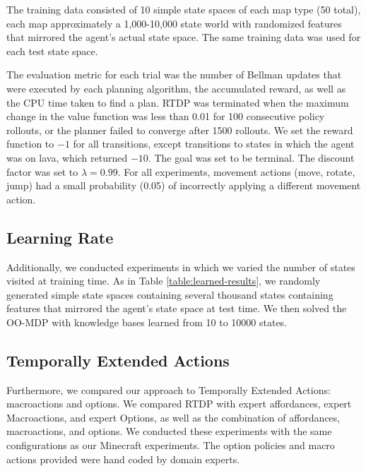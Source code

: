 \documentclass[conference]{IEEEtran}
\newcommand{\dnote}[1]{\textcolor{Green}{\textbf{}}}
\begin{document}
The training data consisted of 10 simple state spaces of each map type
(50 total), each map approximately a 1,000-10,000 state world with randomized
features that mirrored the agent's actual state space. The same training data
was used for each test state space.

The evaluation metric for each trial was the
number of Bellman updates that were executed by each planning
algorithm, the accumulated reward, as well as the CPU time taken to find a plan. RTDP was terminated
when the maximum change in the value function was less than 0.01 for 100 
consecutive policy rollouts, or the planner failed to converge after 1500 rollouts. 
We set the reward  function to $-1$ for all transitions, except transitions to states in 
which the agent was on lava, which returned $-10$. The goal was set to be 
terminal. The discount factor was set to $\lambda = 0.99$. For all experiments,
movement actions (move, rotate, jump) had a small probability (0.05) of 
incorrectly applying a different movement action.

\subsection{Learning Rate}
Additionally, we conducted experiments in which we varied the number of states visited at training time. 
As in Table \ref{table:learned-results}, we randomly generated simple state spaces
containing several thousand states containing features that mirrored the agent's state
space at test time. We then solved the OO-MDP with knowledge bases learned from 
10 to 10000 states.\dnote{update when training complete}

\subsection{Temporally Extended Actions}
Furthermore, we compared our approach to Temporally Extended Actions: 
macroactions and options. We compared RTDP with expert affordances, 
expert Macroactions, and expert Options, as well as the combination of 
affordances, macroactions, and options. We conducted these experiments 
with the same configurations as our Minecraft experiments. The option policies
and macro actions provided were hand coded by domain experts.

%
\end{document}
